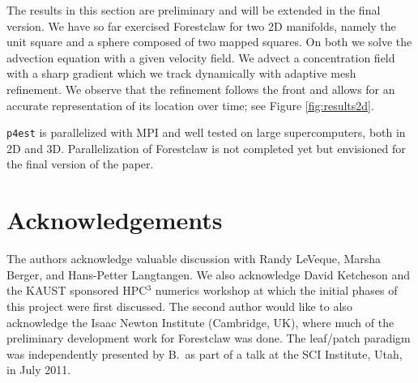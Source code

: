\documentclass{IOS-Book-Article}     %
\newcommand{\forestclaw}{Forestclaw\xspace}
\newcommand{\pforest}{\texttt{p4est}\xspace}
\newcommand{\Fig}[1]{Figure \ref{fig:#1}}
\begin{document}
The results in this section are preliminary and will be extended in the final
version.  We have so far exercised \forestclaw for two 2D manifolds, namely the
unit square and a sphere composed of two mapped squares.  On both we solve the
advection equation with a given velocity field.  We advect a concentration
field with a sharp gradient which we track dynamically with adaptive mesh
refinement.  We observe that the refinement follows the front and allows for an
accurate representation of its location over time; see \Fig{results2d}.

\pforest is parallelized with MPI and well tested on large supercomputers, both
in 2D and 3D.  Parallelization of \forestclaw is not completed yet but
envisioned for the final version of the paper.

\section*{Acknowledgements}

The authors acknowledge valuable discussion with Randy LeVeque, Marsha
Berger, and Hans-Petter Langtangen.  We also acknowledge David
Ketcheson and the KAUST sponsored HPC$^3$ numerics workshop at which
the initial phases of this project were first discussed.  The second
author would like to also acknowledge the Isaac Newton Institute
(Cambridge, UK), where much of the preliminary development work for
\forestclaw was done. The leaf/patch paradigm was independently
presented by B.\ as part of a talk at the SCI Institute, Utah, in July
2011.




\end{document}
